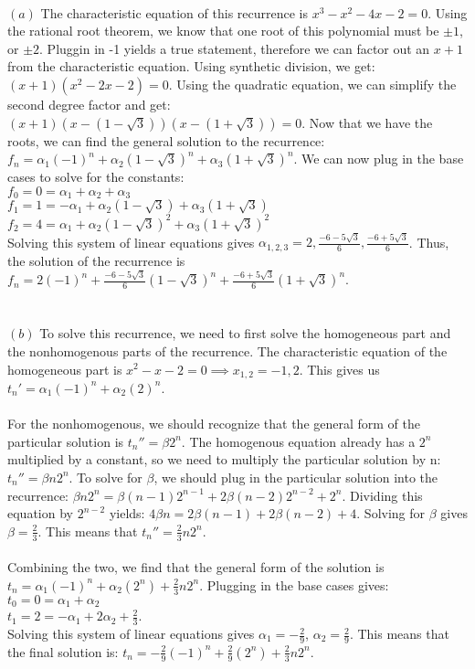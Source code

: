 \documentclass[11pt]{article}
\begin{document}
\newpage
\begin{solution} \\
	$(a)$ 
		The characteristic equation of this recurrence is $x^3 - x^2 -4x - 2 = 0$. Using the rational root theorem, we know that one root of this polynomial must be $\pm1$, or $\pm 2$. Pluggin in -1 yields a true statement, therefore we can factor out an $x+1$ from the characteristic equation. Using synthetic division, we get: $(x+1)(x^2 - 2x - 2) = 0$. Using the quadratic equation, we can simplify the second degree factor and get: $(x+1)(x - (1 - \sqrt{3}))(x-(1+ \sqrt{3})) = 0$. Now that we have the roots, we can find the general solution to the recurrence: $f_n = \alpha_1(-1)^n + \alpha_2(1 - \sqrt{3})^n + \alpha_3(1 + \sqrt{3})^n $. We can now plug in the base cases to solve for the constants: \\ $f_0 = 0 = \alpha_1 + \alpha_2 + \alpha_3$ \\ $ f_1 = 1 = -\alpha_1 + \alpha_2(1-\sqrt{3}) + \alpha_3(1+\sqrt{3}) $ \\ $ f_2 = 4 = \alpha_1 + \alpha_2(1-\sqrt{3})^2 + \alpha_3(1+\sqrt{3})^2 $ \\ Solving this system of linear equations gives $\alpha_{1,2,3} = 2, \frac{-6 - 5\sqrt{3}}{6}, \frac{-6 + 5\sqrt{3}}{6} $. Thus, the solution of the recurrence is $f_n = 2(-1)^n + \frac{-6 - 5\sqrt{3}}{6}(1 - \sqrt{3})^n + \frac{-6 + 5\sqrt{3}}{6}(1 + \sqrt{3})^n $.
	\\\\\\
	$(b)$ To solve this recurrence, we need to first solve the homogeneous part and the nonhomogenous parts of the recurrence. The characteristic equation of the homogeneous part is $x^2 - x - 2 = 0 \implies x_{1,2} = -1, 2$. This gives us $t_n' = \alpha_1 (-1)^n + \alpha_2 (2)^n$.
	\\\\ For the nonhomogenous, we should recognize that the general form of the particular solution is $t_n'' = \beta 2^{n}$. The homogenous equation already has a $2^n$ multiplied by a constant, so we need to multiply the particular solution by n: $t_n'' = \beta n2^{n}$. To solve for $\beta$, we should plug in the particular solution into the recurrence: $\beta n2^n = \beta(n-1)2^{n-1} + 2\beta(n-2)2^{n-2} + 2^n$. Dividing this equation by $2^{n-2}$ yields: $4\beta n = 2\beta(n-1) + 2\beta (n-2) + 4$. Solving for $\beta$ gives $\beta = \frac{2}{3}$. This means that $t_n'' = \frac{2}{3}n 2^n$.
	\\\\ Combining the two, we find that the general form of the solution is $t_n = \alpha_1 (-1)^n + \alpha_2 (2^n) + \frac{2}{3}n2^n$. Plugging in the base cases gives:
	\\ $t_0 = 0 = \alpha_1 + \alpha_2$
	\\ $t_1 = 2 = -\alpha_1 + 2\alpha_2 + \frac{2}{3}$.
	\\ Solving this system of linear equations gives $\alpha_1 = -\frac{2}{9}$, $\alpha_2 = \frac{2}{9}$. This means that the final solution is: $t_n = -\frac{2}{9}(-1)^n + \frac{2}{9}(2^n) + \frac{2}{3}n2^n$.

	\end{solution}
\end{document}
